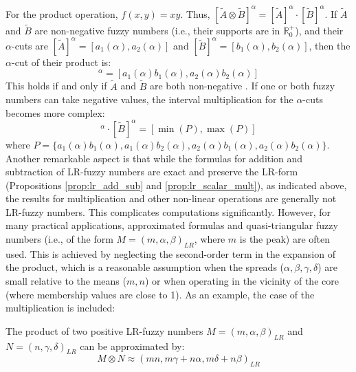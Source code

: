 For the product operation, $f(x,y) = xy$. Thus, $[\tilde{A} \otimes \tilde{B}]^\alpha = [\tilde{A}]^\alpha \cdot [\tilde{B}]^\alpha$.
If $\tilde{A}$ and $\tilde{B}$ are non-negative fuzzy numbers (i.e., their supports are in $\mathbb{R}^+_0$), and their $\alpha$-cuts are $[\tilde{A}]^\alpha = [a_1(\alpha), a_2(\alpha)]$ and $[\tilde{B}]^\alpha = [b_1(\alpha), b_2(\alpha)]$, then the $\alpha$-cut of their product is:
\begin{equation}
[\tilde{A} \otimes \tilde{B}]^\alpha = [a_1(\alpha)b_1(\alpha), a_2(\alpha)b_2(\alpha)]
\end{equation}
This holds if and only if $\tilde{A}$ and $\tilde{B}$ are both non-negative \cite[p.18]{FULLER2}.
If one or both fuzzy numbers can take negative values, the interval multiplication for the $\alpha$-cuts becomes more complex:
\begin{equation}
[\tilde{A}]^\alpha \cdot [\tilde{B}]^\alpha = [\min(P), \max(P)]
\end{equation}
where $P = \{a_1(\alpha)b_1(\alpha), a_1(\alpha)b_2(\alpha), a_2(\alpha)b_1(\alpha), a_2(\alpha)b_2(\alpha)\}$.\\

Another remarkable aspect is that while the formulas for addition and subtraction of LR-fuzzy numbers are exact and preserve the LR-form (Propositions \ref{prop:lr_add_sub} and \ref{prop:lr_scalar_mult}), as indicated above, the results for multiplication and other non-linear operations are generally not LR-fuzzy numbers. This complicates computations significantly. However, for many practical applications, approximated formulas and quasi-triangular fuzzy numbers (i.e., of the form $M=(m, \alpha, \beta)_{LR}$, where $m$ is the peak) are often used. This is achieved by neglecting the second-order term in the expansion of the product, which is a reasonable assumption when the spreads ($\alpha, \beta, \gamma, \delta$) are small relative to the means ($m, n$) or when operating in the vicinity of the core (where membership values are close to 1). As an example, the case of the multiplication is included:

\begin{proposition}
The product of two positive LR-fuzzy numbers $M=(m, \alpha, \beta)_{LR}$ and $N=(n, \gamma, \delta)_{LR}$ can be approximated by:
\begin{equation}
M \otimes N \approx (mn, m\gamma + n\alpha, m\delta + n\beta)_{LR}
\end{equation}
\end{proposition}



